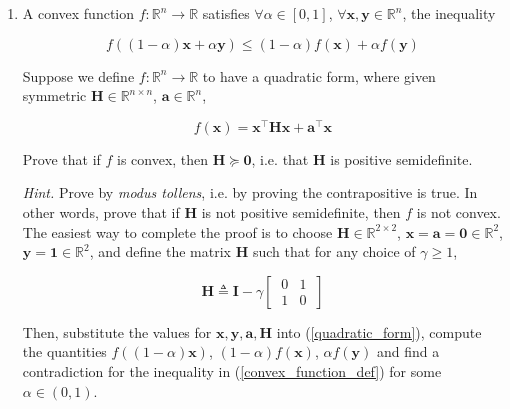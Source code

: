 \documentclass{article}
\numberwithin{equation}{section}
\begin{document}
\begin{enumerate}
    \item
    A convex function $ f : \mathbb{R}^n \rightarrow \mathbb{R} $ satisfies
    $ \forall \alpha \in [0, 1] $, $ \forall \mathbf{x}, \mathbf{y} \in
    \mathbb{R}^n $, the inequality

    \begin{equation} \label{convex_function_def}
        f((1 - \alpha)\mathbf{x} + \alpha\mathbf{y}) \le
        (1 - \alpha)f(\mathbf{x}) + \alpha f(\mathbf{y})
    \end{equation}
    
    Suppose we define $ f : \mathbb{R}^n \rightarrow
    \mathbb{R} $ to have a quadratic form, where given symmetric
    $ \mathbf{H} \in \mathbb{R}^{n \times n} $, $ \mathbf{a} \in \mathbb{R}^n $,

    \begin{equation} \label{quadratic_form}
        f(\mathbf{x}) = \mathbf{x}^\top\mathbf{Hx} + \mathbf{a}^\top\mathbf{x}
    \end{equation}

    Prove that if $ f $ is convex, then $ \mathbf{H} \succeq \mathbf{0} $, i.e.
    that $ \mathbf{H} $ is positive semidefinite.

    \medskip

    \textit{Hint.} Prove by \textit{modus tollens}, i.e. by proving the
    contrapositive is true. In other words, prove that if $ \mathbf{H} $ is not
    positive semidefinite, then $ f $ is not convex. The easiest way to complete
    the proof is to choose $ \mathbf{H} \in \mathbb{R}^{2 \times 2} $,
    $ \mathbf{x} = \mathbf{a} = \mathbf{0} \in \mathbb{R}^2 $, $ \mathbf{y} =
    \mathbf{1} \in \mathbb{R}^2 $, and define the matrix $ \mathbf{H} $ such
    that for any choice of $ \gamma \ge 1 $,

    \begin{equation*}
        \mathbf{H} \triangleq \mathbf{I} -
        \gamma\begin{bmatrix} \ 0 & 1 \ \\ \ 1 & 0 \ \end{bmatrix}
    \end{equation*}

    Then, substitute the values for $ \mathbf{x}, \mathbf{y}, \mathbf{a},
    \mathbf{H} $ into (\ref{quadratic_form}), compute the quantities
    $ f((1 - \alpha)\mathbf{x}) $, $ (1 - \alpha)f(\mathbf{x}) $,
    $ \alpha f(\mathbf{y}) $ and find a contradiction for the inequality in
    (\ref{convex_function_def}) for some $ \alpha \in  (0, 1) $.


\end{enumerate}
\end{document}
